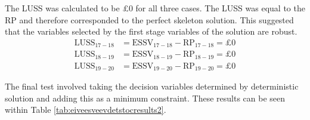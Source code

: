 \documentclass[../thesis.tex]{subfiles}
\begin{document}
The LUSS was calculated to be $\pounds$0 for all three cases. The LUSS was equal to the RP and therefore corresponded to the perfect skeleton solution. This suggested that the variables selected by the first stage variables of the solution are robust. 
\begin{align}
    \text{LUSS}_{17-18} &= \text{ESSV}_{17-18} - \text{RP}_{17-18} = \pounds0 \\
    \text{LUSS}_{18-19} &= \text{ESSV}_{18-19} - \text{RP}_{18-19} = \pounds0  \\
    \text{LUSS}_{19-20} &= \text{ESSV}_{19-20} - \text{RP}_{19-20} = \pounds0
\end{align}

The final test involved taking the decision variables determined by deterministic solution and adding this as a minimum constraint. These results can be seen within Table \ref{tab:eiveesveevdetstocresults2}. 
\end{document}
